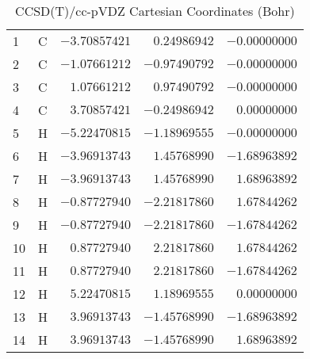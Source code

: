 \documentclass[10pt,oneside]{article}
\begin{document}
\begin{table}[h!]
\centering
\caption{CCSD(T)/cc-pVDZ Cartesian Coordinates (Bohr)}
\begin{tabular}{llrrr}
1  & C  & $-3.70857421$ & $ 0.24986942$ & $-0.00000000$ \\
2  & C  & $-1.07661212$ & $-0.97490792$ & $-0.00000000$ \\
3  & C  & $ 1.07661212$ & $ 0.97490792$ & $-0.00000000$ \\
4  & C  & $ 3.70857421$ & $-0.24986942$ & $ 0.00000000$ \\
5  & H  & $-5.22470815$ & $-1.18969555$ & $-0.00000000$ \\
6  & H  & $-3.96913743$ & $ 1.45768990$ & $-1.68963892$ \\
7  & H  & $-3.96913743$ & $ 1.45768990$ & $ 1.68963892$ \\
8  & H  & $-0.87727940$ & $-2.21817860$ & $ 1.67844262$ \\
9  & H  & $-0.87727940$ & $-2.21817860$ & $-1.67844262$ \\
10 & H  & $ 0.87727940$ & $ 2.21817860$ & $ 1.67844262$ \\
11 & H  & $ 0.87727940$ & $ 2.21817860$ & $-1.67844262$ \\
12 & H  & $ 5.22470815$ & $ 1.18969555$ & $ 0.00000000$ \\
13 & H  & $ 3.96913743$ & $-1.45768990$ & $-1.68963892$ \\
14 & H  & $ 3.96913743$ & $-1.45768990$ & $ 1.68963892$ \\
\end{tabular}
\end{table}
\end{document}
